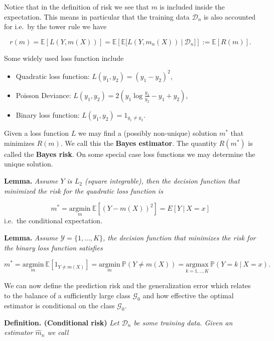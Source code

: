 \documentclass[
]{book}
\providecommand{\tightlist}{%
  \setlength{\itemsep}{0pt}\setlength{\parskip}{0pt}}
\begin{document}
Notice that in the definition of risk we see that \(m\) is included inside the expectation. This means in particular that the training data \(\mathcal{D}_n\) is also accounted for i.e.~by the tower rule we have

\[
r(m)=\mathbb{E}[L(Y,m(X))]=\mathbb{E}\left[\mathbb{E}\Big[L(Y,m_n(X))\ \Big\vert\ \mathcal{D}_n\Big]\right]:=\mathbb{E}\left[R(m)\right].
\]

Some widely used loss function include

\begin{itemize}
\tightlist
\item
  Quadratic loss function: \(L(y_1,y_2)=(y_1-y_2)^2\),
\item
  Poisson Deviance: \(L(y_1,y_2)=2\left(y_1\log\frac{y_1}{y_2}-y_1+y_2\right)\),
\item
  Binary loss function: \(L(y_1,y_2)=1_{y_1\ne y_2}\).
\end{itemize}

Given a loss function \(L\) we may find a (possibly non-unique) solution \(m^*\) that minimizes \(R(m)\). We call this the \textbf{Bayes estimator}. The quantity \(R(m^*)\) is called the \textbf{Bayes risk}. On some special case loss functions we may determine the unique solution.

\textbf{Lemma.} \emph{Assume \(Y\) is \(L_2\) (square integrable), then the decision function that minimized the risk for the quadratic loss function is}

\[
m^*=\underset{m}{\text{argmin}}\ \mathbb{E}[(Y-m(X))^2]=E[Y\ \vert\ X=x]
\]
i.e.~the conditional expectation.

\textbf{Lemma.} \emph{Assume \(\mathcal{Y}=\{1,...,K\}\), the decision function that minimizes the risk for the binary loss function satisfies}

\[
m^*=\underset{m}{\text{argmin}}\ \mathbb{E}[1_{Y\ne m(X)}]=\underset{m}{\text{argmin}}\  \mathbb{P}(Y\ne m(X))=\underset{k=1,..,K}{\text{argmax}}\ \mathbb{P}(Y=k\ \vert\ X=x).
\]

We can now define the prediction risk and the generalization error which relates to the balance of a sufficiently large class \(\mathcal{G}_0\) and how effective the optimal estimator is conditional on the class \(\mathcal{G}_0\).

\textbf{Definition. (Conditional risk)} \emph{Let \(\mathcal{D}_n\) be some training data. Given an estimator \(\hat{m}_n\) we call}
\end{document}
